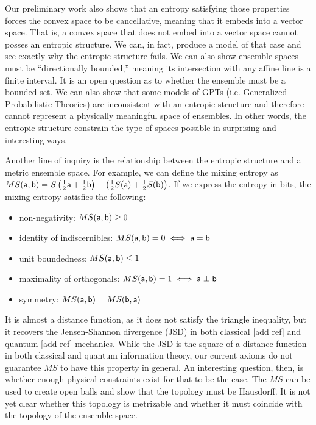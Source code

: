 Our preliminary work also shows that an entropy satisfying those properties forces the convex space to be cancellative, meaning that it embeds into a vector space. That is, a convex space that does not embed into a vector space cannot posses an entropic structure. We can, in fact, produce a model of that case and see exactly why the entropic structure fails. We can also show ensemble spaces must be ``directionally bounded,'' meaning its intersection with any affine line is a finite interval. It is an open question as to whether the ensemble must be a bounded set. We can also show that some models of GPTs (i.e. Generalized Probabilistic Theories) are inconsistent with an entropic structure and therefore cannot represent a physically meaningful space of ensembles. In other words, the entropic structure constrain the type of spaces possible in surprising and interesting ways.

Another line of inquiry is the relationship between the entropic structure and a metric ensemble space. For example, we can define the mixing entropy as $MS(\ens[a], \ens[b]) = S\left(\frac{1}{2}\ens[a] + \frac{1}{2} \ens[b]\right) - \left(\frac{1}{2} S(\ens[a]) + \frac{1}{2} S(\ens[b])\right)$. If we express the entropy in bits, the mixing entropy satisfies the following:
\begin{itemize}
	\item non-negativity: $MS(\ens[a], \ens[b]) \geq 0$
	\item identity of indiscernibles: $MS(\ens[a], \ens[b]) = 0 \iff \ens[a]=\ens[b]$
	\item unit boundedness: $MS(\ens[a], \ens[b]) \leq 1$
	\item maximality of orthogonals: $MS(\ens[a], \ens[b]) = 1 \iff \ens[a] \ortho \ens[b]$
	\item symmetry: $MS(\ens[a], \ens[b]) = MS(\ens[b], \ens[a])$
\end{itemize}
It is almost a distance function, as it does not satisfy the triangle inequality, but it recovers the Jensen-Shannon divergence (JSD) in both classical [add ref] and quantum [add ref] mechanics. While the JSD is the square of a distance function in both classical and quantum information theory, our current axioms do not guarantee $MS$ to have this property in general. An interesting question, then, is whether enough physical constraints exist for that to be the case. The $MS$ can be used to create open balls and show that the topology must be Hausdorff. It is not yet clear whether this topology is metrizable and whether it must coincide with the topology of the ensemble space.

